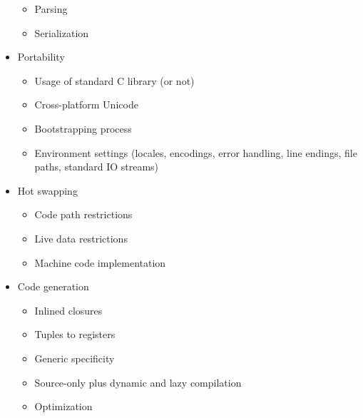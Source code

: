 \begin{itemize}
  \begin{itemize}

  \item Parsing

  \item Serialization

  \end{itemize}

\item Portability

  \begin{itemize}

  \item Usage of standard C library (or not)

  \item Cross-platform Unicode

  \item Bootstrapping process

  \item Environment settings (locales, encodings, error handling, line endings, file paths, standard IO streams)

  \end{itemize}

\item Hot swapping

  \begin{itemize}

  \item Code path restrictions

  \item Live data restrictions

  \item Machine code implementation

  \end{itemize}

\item Code generation

  \begin{itemize}

  \item Inlined closures

  \item Tuples to registers

  \item Generic specificity

  \item Source-only plus dynamic and lazy compilation

  \item Optimization


\end{itemize}
\end{itemize}
